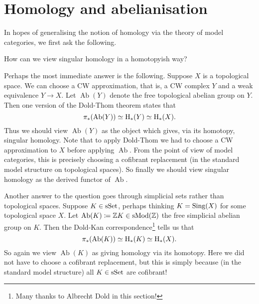 
\section{Homology and abelianisation}
\label{homology-abelian}

In hopes of generalising the notion of homology via the theory of
model categories, we first ask the following.

\begin{question}
  How can we view singular homology in a homotopyish way?
\end{question}

\newcommand{\Ab}{\operatorname{Ab}}
\newcommand{\ab}{\mathrm{ab}}

\begin{nothing}
  \label{sing-doldthom}
  Perhaps the most immediate answer is the following. Suppose $X$ is a
  topological space. We can choose a CW approximation, that is, a CW
  complex $Y$ and a weak equivalence $Y \to X$. Let $\Ab(Y)$ denote
  the free topological abelian group on $Y$. Then one version of the
  Dold-Thom theorem \cite{mccord-doldthom} states that
  \[
  \pi_*(\Ab(Y)) \simeq \H_*(Y) \simeq \H_*(X).
  \]
  Thus we should view $\Ab(Y)$ as the object which gives, via its
  homotopy, singular homology. Note that to apply Dold-Thom we had to
  choose a CW approximation to $X$ before applying $\Ab$. From the
  point of view of model categories, this is precisely choosing a
  cofibrant replacement (in the standard model structure on
  topological spaces). So finally we should view singular homology as
  the derived functor of $\Ab$.
\end{nothing}

\begin{nothing}
  \label{sing-doldkan}
  Another answer to the question goes through simplicial sets rather
  than topological spaces. Suppose $K \in \mathrm{s}\mathrm{Set}$, perhaps thinking $K =
  \operatorname{Sing}(X)$ for some topological space $X$. Let $\Ab(K) \coloneqq \Z
  K\in \s\Mod(\Z)$ the free simplicial abelian group on $K$.  Then the
  Dold-Kan correspondence\footnote{Many thanks to Albrecht Dold in this
    section!} tells us that
  \[
  \pi_*(\Ab(K)) \simeq \H_*(K) \simeq \H_*(X).
  \]
  So again we view $\Ab(K)$ as giving homology via its homotopy. Here
  we did not have to choose a cofibrant replacement, but this is
  simply because (in the standard model structure) all $K \in \mathrm{s}\mathrm{Set}$
  are cofibrant!
\end{nothing}

